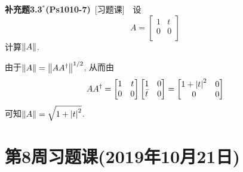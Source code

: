 	\textbf{补充题3.3$ ^* $(Ps1010-7)}\ [习题课]\ \ 设
	\[
	A=\begin{bmatrix}1 & t\\0 & 0\\\end{bmatrix} 
	\]
	计算$ \left\| A \right\| $.
	\begin{Solution}
	由于$ \left\| A \right\|=\left\| AA^\dagger \right\|^{1/2} $, 从而由
	\[
	AA^\dagger=\begin{bmatrix}1&t\\0&0\\\end{bmatrix}
	\begin{bmatrix}1&0\\\bar{t}&0\\\end{bmatrix}=\begin{bmatrix}
	1+\left| t \right| ^2&0\\0&0\\
	\end{bmatrix}
	\]
	可知$ \left\| A \right\|=\sqrt{1+\left| t \right| ^2} $.
	\end{Solution}
	
	\section{第8周习题课(2019年10月21日)}
	
